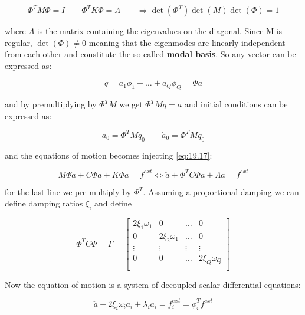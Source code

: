 	\begin{equation}
	\Phi ^T M\Phi = I \qquad \Phi ^T K\Phi = \Lambda \qquad \Rightarrow \det (\Phi ^T) \det( M ) \det (\Phi ) = 1
	\end{equation}
	
	where $\Lambda$ is the matrix containing the eigenvalues on the diagonal. Since M is regular, $\det (\Phi) \neq 0$ meaning that the eigenmodes are linearly independent from each other and constitute the so-called \textbf{modal basis}. So any vector can be expressed as: 
	
	\begin{equation}
	q = a_1 \phi _1 + \dots + a_Q \phi _Q = \Phi a 
	\label{eq:19.17}
	\end{equation}
	
	and by premultiplying by $\Phi ^T M$ we get $\Phi ^T Mq = a$ and initial conditions can be expressed as: 
	
	\begin{equation}
	a_0 = \Phi ^T M q_0\qquad \dot{a}_0 = \Phi ^T M \dot{q}_0
	\end{equation}
	
	and the equations of motion becomes injecting \eqref{eq:19.17}:
	
	\begin{equation}
	M\Phi \ddot{a} + C\Phi \dot{a} + K\Phi a = f^{ext} \Leftrightarrow \ddot{a} + \Phi ^T C\Phi \dot{a} + \Lambda a = f^{ext} 
	\end{equation}
	
	for the last line we pre multiply by $\Phi ^T$. Assuming a proportional damping we can define damping ratios $\xi _i$ and define 
	
	\begin{equation}
	\Phi ^T C \Phi = \Gamma = \left[ 
	\begin{array}{cccc}	
	2\xi _1 \omega _1 & 0 & \dots & 0\\
	0 & 2\xi _2 \omega _1 & \dots & 0\\
	\vdots & \vdots & \vdots & \vdots\\
	0 & 0 & \dots & 2\xi _Q \omega _Q \\ 
	\end{array}	
	\right]
	\end{equation}
	
	Now the equation of motion is a system of decoupled scalar differential equations: 
	
	\begin{equation}
	\ddot{a} + 2\xi _i \omega _i \dot{a}_i + \lambda _i a_i = f_i^{ext} = \phi _i^T f^{ext}
	\end{equation}
	
